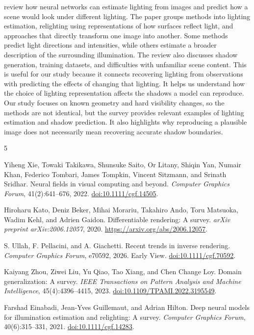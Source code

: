 \documentclass[11pt,letterpaper]{article}
\begin{document}
\citet{einabadi2021illumination} review how neural networks can estimate lighting from images and predict how a scene would look under different lighting. The paper groups methods into lighting estimation, relighting using representations of how surfaces reflect light, and approaches that directly transform one image into another. Some methods predict light directions and intensities, while others estimate a broader description of the surrounding illumination. The review also discusses shadow generation, training datasets, and difficulties with unfamiliar scene content. This is useful for our study because it connects recovering lighting from observations with predicting the effects of changing that lighting. It helps us understand how the choice of lighting representation affects the shadows a model can reproduce. Our study focuses on known geometry and hard visibility changes, so the methods are not identical, but the survey provides relevant examples of lighting estimation and shadow prediction. It also highlights why reproducing a plausible image does not necessarily mean recovering accurate shadow boundaries.

\begin{thebibliography}{5}

Yiheng Xie, Towaki Takikawa, Shunsuke Saito, Or Litany, Shiqin Yan, Numair Khan, Federico Tombari, James Tompkin, Vincent Sitzmann, and Srinath Sridhar.
Neural fields in visual computing and beyond.
\emph{Computer Graphics Forum}, 41(2):641--676, 2022.
\href{https://doi.org/10.1111/cgf.14505}{doi:10.1111/cgf.14505}.

Hiroharu Kato, Deniz Beker, Mihai Morariu, Takahiro Ando, Toru Matsuoka, Wadim Kehl, and Adrien Gaidon.
Differentiable rendering: A survey.
\emph{arXiv preprint arXiv:2006.12057}, 2020.
\url{https://arxiv.org/abs/2006.12057}.

S. Ullah, F. Pellacini, and A. Giachetti.
Recent trends in inverse rendering.
\emph{Computer Graphics Forum}, e70592, 2026. Early View.
\href{https://doi.org/10.1111/cgf.70592}{doi:10.1111/cgf.70592}.

Kaiyang Zhou, Ziwei Liu, Yu Qiao, Tao Xiang, and Chen Change Loy.
Domain generalization: A survey.
\emph{IEEE Transactions on Pattern Analysis and Machine Intelligence}, 45(4):4396--4415, 2023.
\href{https://doi.org/10.1109/TPAMI.2022.3195549}{doi:10.1109/TPAMI.2022.3195549}.


Farshad Einabadi, Jean-Yves Guillemaut, and Adrian Hilton.
Deep neural models for illumination estimation and relighting: A survey.
\emph{Computer Graphics Forum}, 40(6):315--331, 2021.
\href{https://doi.org/10.1111/cgf.14283}{doi:10.1111/cgf.14283}.

\end{thebibliography}
\end{document}
